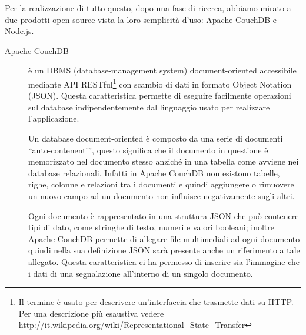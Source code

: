         Per la realizzazione di tutto questo, dopo una fase di ricerca, abbiamo
        mirato a due prodotti open source vista la loro semplicità d'uso:
        Apache CouchDB\texttrademark{} e Node.js.
        \begin{description}
            \item[Apache CouchDB\texttrademark{}] è un DBMS (database-management
                system) doc\-u\-ment-ori\-ented accessibile mediante API RESTful\footnote{Il termine è usato
                per descrivere un'interfaccia che trasmette dati su HTTP. Per una
                descrizione più esaustiva vedere
                \url{http://it.wikipedia.org/wiki/Representational_State_Transfer}}
                con scambio di dati in formato \js{} Object Notation (JSON). Questa
                caratteristica permette di eseguire facilmente operazioni sul database
                indipendentemente dal linguaggio usato per realizzare l'applicazione.

                Un database document-oriented è composto da una serie di documenti
                ``auto-contenenti'', questo significa che il documento in
                questione è memorizzato nel documento stesso anziché in una tabella
                come avviene nei database relazionali. Infatti in Apache CouchDB\texttrademark{}
                non esistono tabelle, righe, colonne e relazioni tra i
                documenti e quindi aggiungere o rimuovere un nuovo
                campo ad un documento non influisce negativamente sugli altri.

                Ogni documento è rappresentato in una struttura JSON che può
                contenere tipi di dato, come stringhe di testo, numeri e valori
                booleani; inoltre Apache CouchDB\texttrademark{} permette
                di allegare file multimediali ad ogni documento quindi nella sua
                definizione JSON sarà presente anche un riferimento a tale allegato.
                Questa caratteristica ci ha permesso di inserire sia l'immagine che
                i dati di una segnalazione all'interno di un singolo documento.


\end{description}
